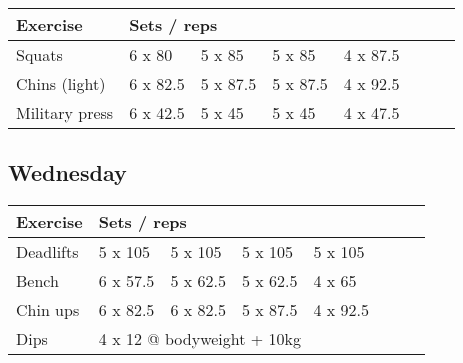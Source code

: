 \documentclass[12pt, a4paper]{article}%
\begin{document}
  \begin{tabular}{l|lllllll}
  \hspace{0.75em} \textbf{Exercise} & \multicolumn{ 7 }{l}{ \textbf{Sets / reps} } \\ \hline

            \hspace{0.75em} Squats
            & 6 x 80
            & 5 x 85
            & 5 x 85
            & 4 x 87.5
            & 
            & 
            & 
            \\


            \hspace{0.75em} Chins (light)
            & 6 x 82.5
            & 5 x 87.5
            & 5 x 87.5
            & 4 x 92.5
            & 
            & 
            & 
            \\


            \hspace{0.75em} Military press
            & 6 x 42.5
            & 5 x 45
            & 5 x 45
            & 4 x 47.5
            & 
            & 
            & 
            \\


  \end{tabular}

  \subsection*{\hspace{0.5em} Wednesday }


  \begin{tabular}{l|lllllll}
  \hspace{0.75em} \textbf{Exercise} & \multicolumn{ 7 }{l}{ \textbf{Sets / reps} } \\ \hline

            \hspace{0.75em} Deadlifts
            & 5 x 105
            & 5 x 105
            & 5 x 105
            & 5 x 105
            & 
            & 
            & 
            \\


            \hspace{0.75em} Bench
            & 6 x 57.5
            & 5 x 62.5
            & 5 x 62.5
            & 4 x 65
            & 
            & 
            & 
            \\


            \hspace{0.75em} Chin ups
            & 6 x 82.5
            & 6 x 82.5
            & 5 x 87.5
            & 4 x 92.5
            & 
            & 
            & 
            \\


   \hspace{0.75em} Dips &  \multicolumn{ 7 }{l}{ 4 x 12 @ bodyweight + 10kg } \\
  \end{tabular}
\end{document}
